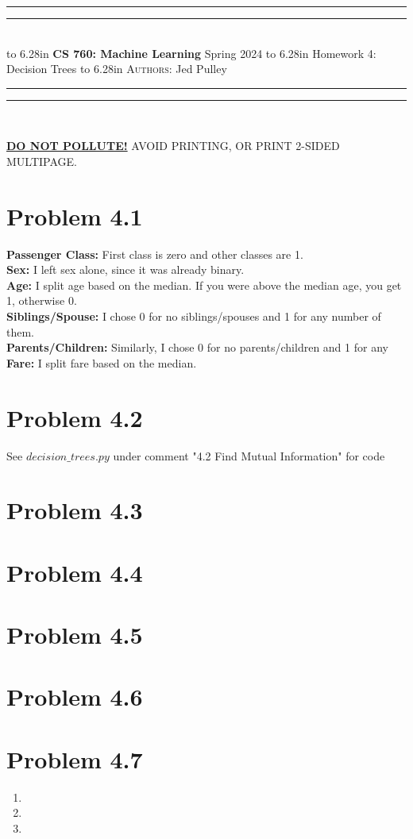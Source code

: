 \documentclass{article}
\newcommand{\lecture}[2]{
\pagestyle{myheadings}
\thispagestyle{plain}
\newpage
\noindent
\begin{center}
\rule{\textwidth}{1.6pt}\vspace*{-\baselineskip}\vspace*{2pt} %
\rule{\textwidth}{0.4pt}\\[1\baselineskip] %
\vbox{\vspace{2mm}
\hbox to 6.28in { {\bf CS 760: Machine Learning} \hfill Spring 2024 }
\vspace{4mm}
\hbox to 6.28in { {\Large \hfill #1  \hfill} }
\vspace{4mm}
\hbox to 6.28in { {\scshape Authors:}  #2 \hfill }}
\vspace{-2mm}
\rule{\textwidth}{0.4pt}\vspace*{-\baselineskip}\vspace{3.2pt} %
\rule{\textwidth}{1.6pt}\\[\baselineskip] %
\end{center}
\vspace*{4mm}
}
\begin{document}
\lecture{Homework 4: Decision Trees}{Jed Pulley}

\begin{center}
{\Large {\sf \underline{\textbf{DO NOT POLLUTE!}} AVOID PRINTING, OR PRINT 2-SIDED MULTIPAGE.}}
\end{center}

\section*{Problem 4.1}
\textbf{Passenger Class:} First class is zero and other classes are 1. \\
\textbf{Sex:} I left sex alone, since it was already binary. \\
\textbf{Age:} I split age based on the median. If you were above the median age, you get 1, otherwise 0. \\
\textbf{Siblings/Spouse:} I chose 0 for no siblings/spouses and 1 for any number of them. \\
\textbf{Parents/Children:} Similarly, I chose 0 for no parents/children and 1 for any \\
\textbf{Fare:} I split fare based on the median.

\section*{Problem 4.2}
See $decision\_trees.py$ under comment "4.2 Find Mutual Information" for code

\section*{Problem 4.3}

\section*{Problem 4.4}

\section*{Problem 4.5}

\section*{Problem 4.6}

\section*{Problem 4.7}
\begin{enumerate}[label=(\alph*)]
  \item 
  \item 
  \item 
\end{enumerate}
\end{document}
